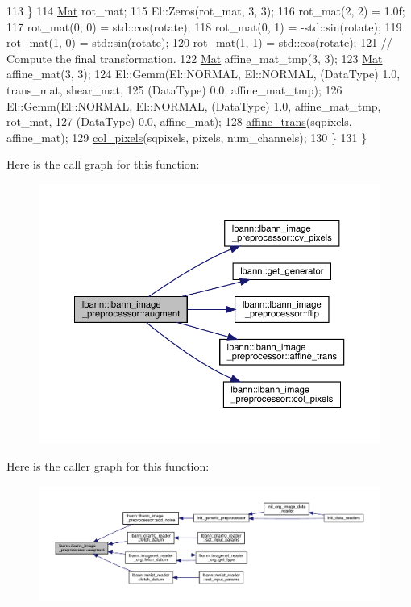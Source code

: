 \begin{DoxyCode}
113     \}
114     \hyperlink{base_8hpp_a68f11fdc31b62516cb310831bbe54d73}{Mat} rot\_mat;
115     El::Zeros(rot\_mat, 3, 3);
116     rot\_mat(2, 2) = 1.0f;
117     rot\_mat(0, 0) = std::cos(rotate);
118     rot\_mat(0, 1) = -std::sin(rotate);
119     rot\_mat(1, 0) = std::sin(rotate);
120     rot\_mat(1, 1) = std::cos(rotate);
121     \textcolor{comment}{// Compute the final transformation.}
122     \hyperlink{base_8hpp_a68f11fdc31b62516cb310831bbe54d73}{Mat} affine\_mat\_tmp(3, 3);
123     \hyperlink{base_8hpp_a68f11fdc31b62516cb310831bbe54d73}{Mat} affine\_mat(3, 3);
124     El::Gemm(El::NORMAL, El::NORMAL, (DataType) 1.0, trans\_mat, shear\_mat,
125              (DataType) 0.0, affine\_mat\_tmp);
126     El::Gemm(El::NORMAL, El::NORMAL, (DataType) 1.0, affine\_mat\_tmp, rot\_mat,
127              (DataType) 0.0, affine\_mat);
128     \hyperlink{classlbann_1_1lbann__image__preprocessor_adb9e017aeac52a9b5d392f17188d1057}{affine\_trans}(sqpixels, affine\_mat);
129     \hyperlink{classlbann_1_1lbann__image__preprocessor_a3e99be32b95a415fd8d616cb85075df1}{col\_pixels}(sqpixels, pixels, num\_channels);
130   \}
131 \}
\end{DoxyCode}
Here is the call graph for this function\+:\nopagebreak
\begin{figure}[H]
\begin{center}
\leavevmode
\includegraphics[width=350pt]{classlbann_1_1lbann__image__preprocessor_a27cb5182c4f764cbfa4edecbb78ef29d_cgraph}
\end{center}
\end{figure}
Here is the caller graph for this function\+:\nopagebreak
\begin{figure}[H]
\begin{center}
\leavevmode
\includegraphics[width=350pt]{classlbann_1_1lbann__image__preprocessor_a27cb5182c4f764cbfa4edecbb78ef29d_icgraph}
\end{center}
\end{figure}
